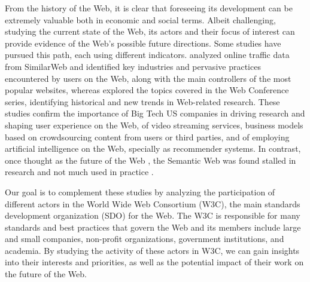 \documentclass[sigconf, nonacm]{acmart}              %
\begin{document}
From the history of the Web, it is clear that foreseeing its development can be extremely valuable both in economic and social terms. Albeit challenging, studying the current state of the Web, its actors and their focus of interest can provide evidence of the Web's possible future directions. Some studies have pursued this path, each using different indicators. \cite{Xavier2024} analyzed online traffic data from SimilarWeb and identified key industries and pervasive practices encountered by users on the Web, along with the main controllers of the most popular websites, whereas \cite{Graux2022} explored the topics covered in the Web Conference series, identifying historical and new trends in Web-related research. These studies confirm the importance of Big Tech US companies in driving research and shaping user experience on the Web, of video streaming services, business models based on crowdsourcing content from users or third parties, and of employing artificial intelligence on the Web, specially as recommender systems. In contrast, once thought as the future of the Web \cite{BernersLee2001}, the Semantic Web was found stalled in research and not much used in practice \cite{Hogan2020}.

Our goal is to complement these studies by analyzing the participation of different actors in the World Wide Web Consortium (W3C), the main standards development organization (SDO) for the Web. The W3C is responsible for many standards and best practices that govern the Web and its members include large and small companies, non-profit organizations, government institutions, and academia. By studying the activity of these actors in W3C, we can gain insights into their interests and priorities, as well as the potential impact of their work on the future of the Web.

\end{document}
